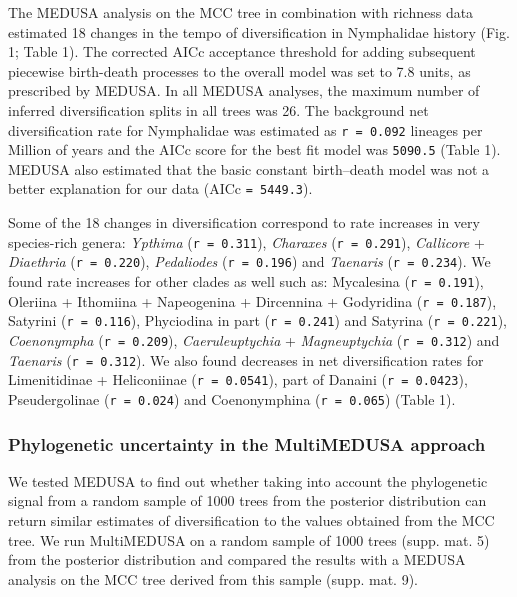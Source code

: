 \documentclass[10pt]{article}
\begin{document}
The MEDUSA analysis on the MCC tree in combination with richness data
estimated 18 changes in the tempo of diversification in Nymphalidae
history (Fig. 1; Table 1). The corrected AICc acceptance threshold for
adding subsequent piecewise birth-death processes to the overall model
was set to 7.8 units, as prescribed by MEDUSA. In all MEDUSA analyses,
the maximum number of inferred diversification splits in all trees was
26. The background net diversification rate for Nymphalidae was
estimated as \texttt{r = 0.092} lineages per Million of years and the
AICc score for the best fit model was \texttt{5090.5} (Table 1). MEDUSA
also estimated that the basic constant birth--death model was not a
better explanation for our data (AICc \texttt{= 5449.3}).

Some of the 18 changes in diversification correspond to rate increases
in very species-rich genera: \emph{Ypthima} (\texttt{r = 0.311}),
\emph{Charaxes} (\texttt{r = 0.291}), \emph{Callicore} +
\emph{Diaethria} (\texttt{r = 0.220}), \emph{Pedaliodes}
(\texttt{r = 0.196}) and \emph{Taenaris} (\texttt{r = 0.234}). We found
rate increases for other clades as well such as: Mycalesina
(\texttt{r = 0.191}), Oleriina + Ithomiina + Napeogenina + Dircennina +
Godyridina (\texttt{r = 0.187}), Satyrini (\texttt{r = 0.116}),
Phyciodina in part (\texttt{r = 0.241}) and Satyrina
(\texttt{r = 0.221}), \emph{Coenonympha} (\texttt{r = 0.209}),
\emph{Caeruleuptychia} + \emph{Magneuptychia} (\texttt{r = 0.312}) and
\emph{Taenaris} (\texttt{r = 0.312}). We also found decreases in net
diversification rates for Limenitidinae + Heliconiinae
(\texttt{r = 0.0541}), part of Danaini (\texttt{r = 0.0423}),
Pseudergolinae (\texttt{r = 0.024}) and Coenonymphina
(\texttt{r = 0.065}) (Table 1).

\subsubsection{Phylogenetic uncertainty in the MultiMEDUSA
approach}\label{phylogenetic-uncertainty-in-the-multimedusa-approach}

We tested MEDUSA to find out whether taking into account the
phylogenetic signal from a random sample of 1000 trees from the
posterior distribution can return similar estimates of diversification
to the values obtained from the MCC tree. We run MultiMEDUSA on a random
sample of 1000 trees (supp. mat. 5) from the posterior distribution and
compared the results with a MEDUSA analysis on the MCC tree derived from
this sample (supp. mat. 9).
\end{document}
